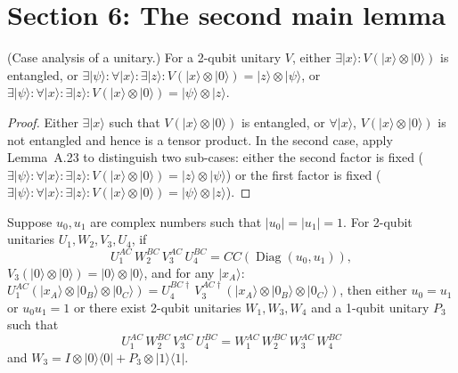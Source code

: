 \section{Section 6: The second main lemma}

\begin{lemma}
  \label{lem:s6_1}
  \leanok
  (Case analysis of a unitary.)
  For a 2-qubit unitary $V$, either
  $\exists |x\rangle : V(|x\rangle \otimes |0\rangle)$ is entangled, or
  $\exists |\psi\rangle : \forall |x\rangle : \exists |z\rangle :
    V(|x\rangle \otimes |0\rangle) = |z\rangle \otimes |\psi\rangle$, or
  $\exists |\psi\rangle : \forall |x\rangle : \exists |z\rangle :
    V(|x\rangle \otimes |0\rangle) = |\psi\rangle \otimes |z\rangle$.
\end{lemma}

\begin{proof}
  \leanok
  Either $\exists |x\rangle$ such that $V(|x\rangle \otimes |0\rangle)$ is entangled,
  or $\forall |x\rangle$, $V(|x\rangle \otimes |0\rangle)$ is not entangled
  and hence is a tensor product.
  In the second case, apply Lemma~A.23 to distinguish two sub-cases:
  either the second factor is fixed
  ($\exists |\psi\rangle : \forall |x\rangle : \exists |z\rangle :
    V(|x\rangle \otimes |0\rangle) = |z\rangle \otimes |\psi\rangle$)
  or the first factor is fixed
  ($\exists |\psi\rangle : \forall |x\rangle : \exists |z\rangle :
    V(|x\rangle \otimes |0\rangle) = |\psi\rangle \otimes |z\rangle$).
\end{proof}

\begin{lemma}
  \label{lem:s6_2}
  \leanok
  Suppose $u_0, u_1$ are complex numbers such that $|u_0| = |u_1| = 1$.
  For 2-qubit unitaries $U_1, W_2, V_3, U_4$, if
  \[
    U_1^{AC}\, W_2^{BC}\, V_3^{AC}\, U_4^{BC} = CC(\operatorname{Diag}(u_0, u_1)),
  \]
  $V_3(|0\rangle \otimes |0\rangle) = |0\rangle \otimes |0\rangle$, and
  for any $|x_A\rangle$:
  $U_1^{AC}(|x_A\rangle \otimes |0_B\rangle \otimes |0_C\rangle)
   = U_4^{BC\dagger}\, V_3^{AC\dagger}(|x_A\rangle \otimes |0_B\rangle \otimes |0_C\rangle)$,
  then either $u_0 = u_1$ or $u_0 u_1 = 1$ or there exist 2-qubit unitaries
  $W_1, W_3, W_4$ and a 1-qubit unitary $P_3$ such that
  \[
    U_1^{AC}\, W_2^{BC}\, V_3^{AC}\, U_4^{BC}
    = W_1^{AC}\, W_2^{BC}\, W_3^{AC}\, W_4^{BC}
  \]
  and $W_3 = I \otimes |0\rangle\langle 0| + P_3 \otimes |1\rangle\langle 1|$.
\end{lemma}

